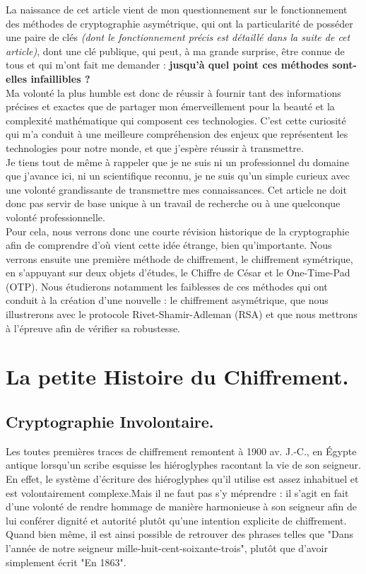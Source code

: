 \documentclass{article}
\begin{document}
La naissance de cet article vient de mon questionnement sur le fonctionnement des méthodes de cryptographie asymétrique, qui ont la particularité de posséder une paire de clés \textit{(dont le fonctionnement précis est détaillé dans la suite de cet article)}, dont une clé publique, qui peut, à ma grande surprise, être connue de tous et qui m'ont fait me demander : \textbf{jusqu'à quel point ces méthodes sont-elles infaillibles ?} \\

Ma volonté la plus humble est donc de réussir à fournir tant des informations précises et exactes que de partager mon émerveillement pour la beauté et la complexité mathématique qui composent ces technologies. C'est cette curiosité qui m'a conduit à une meilleure compréhension des enjeux que représentent les technologies pour notre monde, et que j'espère réussir à transmettre. \\

Je tiens tout de même à rappeler que je ne suis ni un professionnel du domaine que j'avance ici, ni un scientifique reconnu, je ne suis qu'un simple curieux avec une volonté grandissante de transmettre mes connaissances. Cet article ne doit donc pas servir de base unique à un travail de recherche ou à une quelconque volonté professionnelle.  \\

Pour cela, nous verrons donc une courte révision historique de la cryptographie afin de comprendre d'où vient cette idée étrange, bien qu'importante. Nous verrons ensuite une première méthode de chiffrement, le chiffrement symétrique, en s'appuyant sur deux objets d'études, le Chiffre de César et le One-Time-Pad (OTP). Nous étudierons notamment les faiblesses de ces méthodes qui ont conduit à la création d'une nouvelle : le chiffrement asymétrique, que nous illustrerons avec le protocole Rivet-Shamir-Adleman (RSA) et que nous mettrons à l'épreuve afin de vérifier sa robustesse. 


\section{La petite Histoire du
	Chiffrement.}\label{la-petite-histoire-du-chiffrement.}

\subsection{Cryptographie Involontaire.}\label{egypte.}
Les toutes premières traces de chiffrement remontent à 1900 av. J.-C.,
en Égypte antique lorsqu'un scribe esquisse les hiéroglyphes racontant
la vie de son seigneur. En effet, le système d'écriture des hiéroglyphes
qu'il utilise est assez inhabituel et est volontairement complexe.Mais il ne faut pas s'y méprendre : il s'agit en fait d'une volonté de rendre hommage de manière
harmonieuse à son seigneur afin de lui conférer dignité et autorité
plutôt qu'une intention explicite de chiffrement. Quand bien même, il est ainsi possible
de retrouver des phrases telles que "Dans l'année de notre seigneur
mille-huit-cent-soixante-trois", plutôt que d'avoir simplement écrit
"En 1863". \\
\end{document}
